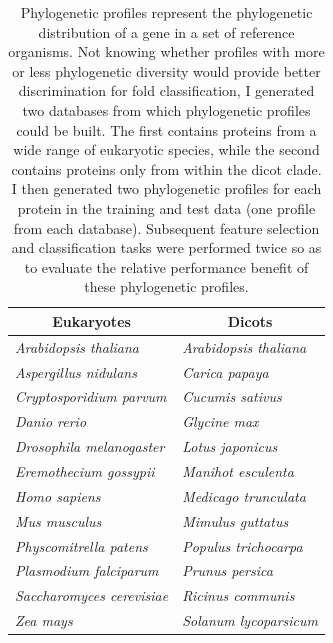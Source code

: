 \documentclass{bioinfo}
\begin{document}
\begin{table} \centering
  \begin{tabular}{ l l }
    \hline
    \multicolumn{1}{c}{\textbf{Eukaryotes}} & \multicolumn{1}{c}{\textbf{Dicots}} \\ \hline
    \textit{Arabidopsis thaliana} & \textit{Arabidopsis thaliana} \\
    \textit{Aspergillus nidulans} & \textit{Carica papaya} \\
    \textit{Cryptosporidium parvum} & \textit{Cucumis sativus} \\
    \textit{Danio rerio} & \textit{Glycine max} \\
    \textit{Drosophila melanogaster} \hspace{15px} & \textit{Lotus japonicus} \\
    \textit{Eremothecium gossypii} & \textit{Manihot esculenta} \\
    \textit{Homo sapiens} & \textit{Medicago trunculata} \\
    \textit{Mus musculus} & \textit{Mimulus guttatus} \\
    \textit{Physcomitrella patens} & \textit{Populus trichocarpa} \\
    \textit{Plasmodium falciparum} & \textit{Prunus persica} \\
    \textit{Saccharomyces cerevisiae} & \textit{Ricinus communis} \\
    \textit{Zea mays} & \textit{Solanum lycoparsicum} \\ \hline
  \end{tabular}
  \vspace{5px}
  \caption{Phylogenetic profiles represent the phylogenetic distribution of a gene in a set of reference organisms. Not knowing whether profiles with more or less phylogenetic diversity would provide better discrimination for fold classification, I generated two databases from which phylogenetic profiles could be built. The first contains proteins from a wide range of eukaryotic species, while the second contains proteins only from within the dicot clade. I then generated two phylogenetic profiles for each protein in the training and test data (one profile from each database). Subsequent feature selection and classification tasks were performed twice so as to evaluate the relative performance benefit of these phylogenetic profiles.}
  \label{PhyloProfTable}
\end{table}
\end{document}
